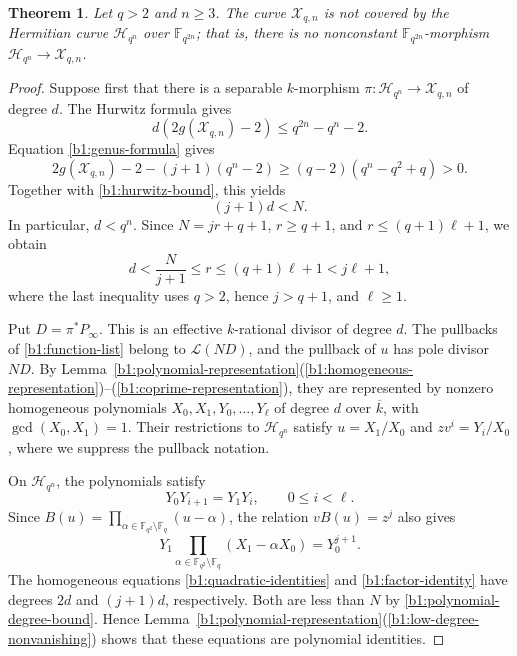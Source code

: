 \documentclass[10pt,a4paper]{amsart}
\numberwithin{equation}{section}
\newcommand{\F}{\mathbb F}
\newtheorem{theorem}{Theorem}[section]
\begin{document}
\begin{theorem}
\label{b1:noncover}
Let \(q>2\) and \(n\ge3\). The curve \(\mathcal X_{q,n}\) is not
covered by the Hermitian curve \(\mathcal H_{q^n}\) over \(\F_{q^{2n}}\);
that is, there is no nonconstant \(\F_{q^{2n}}\)-morphism
\(\mathcal H_{q^n}\to\mathcal X_{q,n}\).
\end{theorem}

\begin{proof}
Suppose first that there is a separable \(k\)-morphism
\(\pi:\mathcal H_{q^n}\to\mathcal X_{q,n}\) of degree \(d\).
The Hurwitz formula gives
\begin{equation}
\label{b1:hurwitz-bound}
 d(2g(\mathcal X_{q,n})-2)\le q^{2n}-q^n-2.
\end{equation}
Equation \eqref{b1:genus-formula} gives
\[
 2g(\mathcal X_{q,n})-2-(j+1)(q^n-2)
 \ge(q-2)(q^n-q^2+q)>0.
\]
Together with \eqref{b1:hurwitz-bound}, this yields
\begin{equation}
\label{b1:polynomial-degree-bound}
 (j+1)d<N.
\end{equation}
In particular, \(d<q^n\).
Since \(N=jr+q+1\), \(r\ge q+1\), and
\(r\le(q+1)\ell+1\), we obtain
\begin{equation}
\label{b1:cover-degree}
 d<\frac{N}{j+1}\le r\le(q+1)\ell+1<j\ell+1,
\end{equation}
where the last inequality uses \(q>2\), hence \(j>q+1\), and
\(\ell\ge1\).

Put \(D=\pi^*P_\infty\). This is an effective \(k\)-rational
divisor of degree \(d\). The pullbacks of \eqref{b1:function-list}
belong to \(\mathcal L(ND)\), and the pullback of \(u\) has pole
divisor \(ND\). By Lemma~\ref{b1:polynomial-representation}(\ref{b1:homogeneous-representation})--(\ref{b1:coprime-representation}), they
are represented by nonzero homogeneous polynomials
\(X_0,X_1,Y_0,\ldots,Y_\ell\) of degree \(d\) over \(\overline{k}\),
with \(\gcd(X_0,X_1)=1\). Their restrictions to \(\mathcal H_{q^n}\)
satisfy \(u=X_1/X_0\) and \(zv^i=Y_i/X_0\), where we suppress
the pullback notation.

On \(\mathcal H_{q^n}\), the polynomials satisfy
\begin{equation}
\label{b1:quadratic-identities}
 Y_0Y_{i+1}=Y_1Y_i,\qquad 0\le i<\ell.
\end{equation}
Since
\(B(u)=\prod_{\alpha\in\F_{q^2}\setminus\F_q}(u-\alpha)\),
the relation \(vB(u)=z^j\) also gives
\begin{equation}
\label{b1:factor-identity}
 Y_1\prod_{\alpha\in\F_{q^2}\setminus\F_q}
 (X_1-\alpha X_0)=Y_0^{j+1}.
\end{equation}
The homogeneous equations \eqref{b1:quadratic-identities} and
\eqref{b1:factor-identity} have degrees \(2d\) and \((j+1)d\),
respectively. Both are less than \(N\) by
\eqref{b1:polynomial-degree-bound}. Hence
Lemma~\ref{b1:polynomial-representation}(\ref{b1:low-degree-nonvanishing}) shows that these equations
are polynomial identities.


\end{proof}
\end{document}
